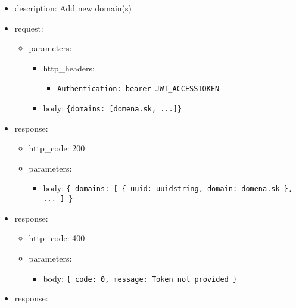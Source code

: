 \documentclass[
]{article}
\begin{document}
\begin{itemize}
\item
  description: Add new domain(s)
\item
  request:

  \begin{itemize}
  \item
    parameters:

    \begin{itemize}
    \item
      http\_headers:

      \begin{itemize}
      \item
        \texttt{Authentication:\ \textquotesingle{}bearer\ JWT\_ACCESSTOKEN\textquotesingle{}}
      \end{itemize}
    \item
      body:
      \texttt{\{\textquotesingle{}domains\textquotesingle{}:\ {[}\textquotesingle{}domena.sk\textquotesingle{},\ ...{]}\}}
    \end{itemize}
  \end{itemize}
\item
  response:

  \begin{itemize}
  \item
    http\_code: 200
  \item
    parameters:

    \begin{itemize}
    \item
      body: \texttt{\{
      \textquotesingle{}domains\textquotesingle{}:\ {[}
      	\{
      		\textquotesingle{}uuid\textquotesingle{}:\ \textquotesingle{}uuidstring\textquotesingle{},
      		\textquotesingle{}domain\textquotesingle{}:\ \textquotesingle{}domena.sk\textquotesingle{}
      	\},
      	...
      {]}
      \}}
    \end{itemize}
  \end{itemize}
\item
  response:

  \begin{itemize}
  \item
    http\_code: 400
  \item
    parameters:

    \begin{itemize}
    \item
      body: \texttt{\{
      \textquotesingle{}code\textquotesingle{}:\ 0,\ 
      \textquotesingle{}message\textquotesingle{}:\ \textquotesingle{}Token\ not\ provided\textquotesingle{}
      \}}
    \end{itemize}
  \end{itemize}
\item
  response:


\end{itemize}
\end{document}
